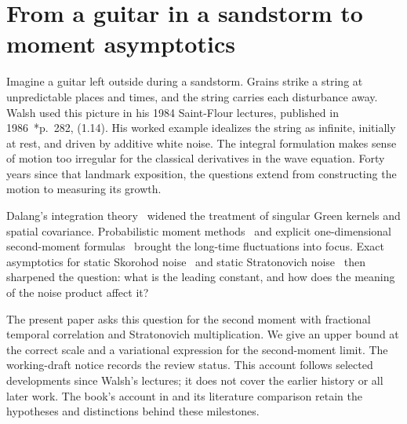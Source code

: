 \Needspace{0.68\textheight}
\section{From a guitar in a sandstorm to moment asymptotics}\label{S:reader-history}



Imagine a guitar left outside during a sandstorm. Grains strike a string at
unpredictable places and times, and the string carries each disturbance away.
Walsh used this picture in his 1984 Saint-Flour lectures, published in
1986~\cite{walsh:86:introduction}*{p.~282, (1.14)}. His worked example idealizes
the string as infinite, initially at rest, and driven by additive white noise.
The integral formulation makes sense of motion too irregular for the classical
derivatives in the wave equation. Forty years since that landmark exposition,
the questions extend from constructing the motion to measuring its growth.

Dalang's integration theory~\cite{dalang:99:extending} widened the treatment of
singular Green kernels and spatial covariance. Probabilistic moment
methods~\cite{dalang.mueller.ea:08:feynman-kac-type} and explicit
one-dimensional second-moment formulas~\cite{chen.dalang:15:moment} brought the
long-time fluctuations into focus. Exact asymptotics for static Skorohod
noise~\cite{balan.chen.ea:22:exact} and static Stratonovich
noise~\cite{chen.hu:25:hyperbolic} then sharpened the question: what is the
leading constant, and how does the meaning of the noise product affect it?

The present paper asks this question for the second moment with fractional
temporal correlation and Stratonovich multiplication. We give an upper bound at
the correct scale and a variational expression for the second-moment limit. The
working-draft notice records the review status. This account follows selected
developments since Walsh's lectures; it does not cover the earlier history or
all later work. The book's account in  and its
literature comparison retain the hypotheses and distinctions behind these
milestones.
